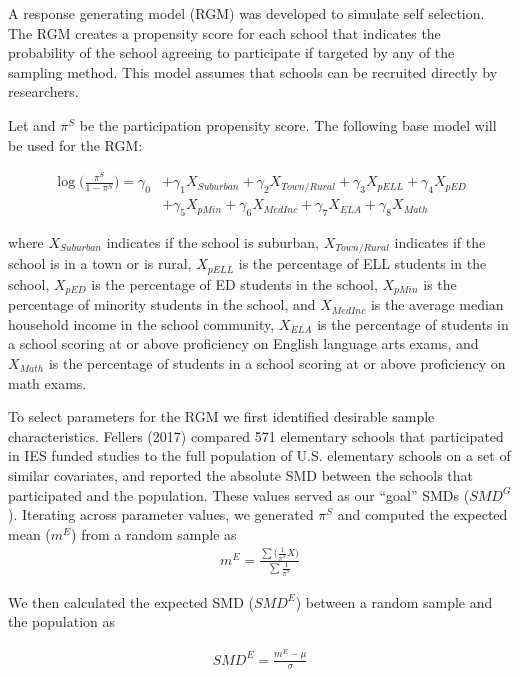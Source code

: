 \documentclass[man,floatsintext]{apa6}
\theoremstyle{definition}
\theoremstyle{definition}
\theoremstyle{definition}
\theoremstyle{remark}
\begin{document}
A response generating model (RGM) was developed to simulate self
selection. The RGM creates a propensity score for each school that
indicates the probability of the school agreeing to participate if
targeted by any of the sampling method. This model assumes that schools
can be recruited directly by researchers.

Let and \(\pi^S\) be the participation propensity score. The following
base model will be used for the RGM:

\begin{align} \label{eq:sRGM}
  \log\bigg(\frac{\pi^S}{1-\pi^S}\bigg) = \gamma_{0} &+ \gamma_{1}X_{Suburban} + \gamma_{2}X_{Town/Rural} + \gamma_{3}X_{pELL} + \gamma_{4}X_{pED} 
  \\
  &+ \gamma_{5}X_{pMin} + \gamma_{6}X_{MedInc} + \gamma_{7}X_{ELA} + \gamma_{8}X_{Math} \nonumber
\end{align}

where \(X_{Suburban}\) indicates if the school is suburban,
\(X_{Town/Rural}\) indicates if the school is in a town or is rural,
\(X_{pELL}\) is the percentage of ELL students in the school,
\(X_{pED}\) is the percentage of ED students in the school, \(X_{pMin}\)
is the percentage of minority students in the school, and \(X_{MedInc}\)
is the average median household income in the school community,
\(X_{ELA}\) is the percentage of students in a school scoring at or
above proficiency on English language arts exams, and \(X_{Math}\) is
the percentage of students in a school scoring at or above proficiency
on math exams.

To select parameters for the RGM we first identified desirable sample
characteristics. Fellers (2017) compared 571 elementary schools that
participated in IES funded studies to the full population of U.S.
elementary schools on a set of similar covariates, and reported the
absolute SMD between the schools that participated and the population.
These values served as our \enquote{goal} SMDs (\(SMD^G\)). Iterating
across parameter values, we generated \(\pi^S\) and computed the
expected mean (\(m^E\)) from a random sample as \begin{align}
  m^E = \frac{\sum{(\frac{1}{\pi^S} X})}{\sum{\frac{1}{\pi^S}}}
\end{align}

We then calculated the expected SMD (\(SMD^E\)) between a random sample
and the population as

\begin{align}
  SMD^E = \frac{m^E - \mu}{\sigma}
\end{align}
\end{document}
